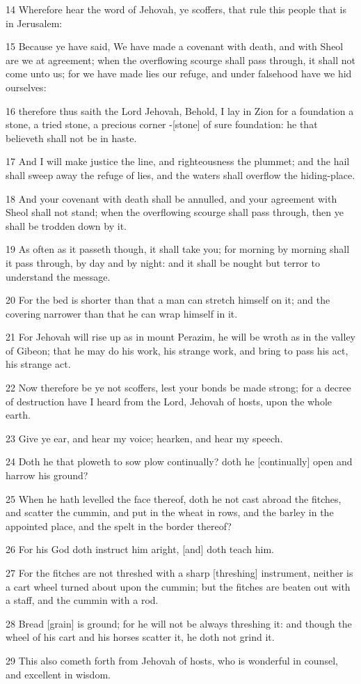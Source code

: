 \par 14 Wherefore hear the word of Jehovah, ye scoffers, that rule this people that is in Jerusalem:
\par 15 Because ye have said, We have made a covenant with death, and with Sheol are we at agreement; when the overflowing scourge shall pass through, it shall not come unto us; for we have made lies our refuge, and under falsehood have we hid ourselves:
\par 16 therefore thus saith the Lord Jehovah, Behold, I lay in Zion for a foundation a stone, a tried stone, a precious corner -[stone] of sure foundation: he that believeth shall not be in haste.
\par 17 And I will make justice the line, and righteousness the plummet; and the hail shall sweep away the refuge of lies, and the waters shall overflow the hiding-place.
\par 18 And your covenant with death shall be annulled, and your agreement with Sheol shall not stand; when the overflowing scourge shall pass through, then ye shall be trodden down by it.
\par 19 As often as it passeth though, it shall take you; for morning by morning shall it pass through, by day and by night: and it shall be nought but terror to understand the message.
\par 20 For the bed is shorter than that a man can stretch himself on it; and the covering narrower than that he can wrap himself in it.
\par 21 For Jehovah will rise up as in mount Perazim, he will be wroth as in the valley of Gibeon; that he may do his work, his strange work, and bring to pass his act, his strange act.
\par 22 Now therefore be ye not scoffers, lest your bonds be made strong; for a decree of destruction have I heard from the Lord, Jehovah of hosts, upon the whole earth.
\par 23 Give ye ear, and hear my voice; hearken, and hear my speech.
\par 24 Doth he that ploweth to sow plow continually? doth he [continually] open and harrow his ground?
\par 25 When he hath levelled the face thereof, doth he not cast abroad the fitches, and scatter the cummin, and put in the wheat in rows, and the barley in the appointed place, and the spelt in the border thereof?
\par 26 For his God doth instruct him aright, [and] doth teach him.
\par 27 For the fitches are not threshed with a sharp [threshing] instrument, neither is a cart wheel turned about upon the cummin; but the fitches are beaten out with a staff, and the cummin with a rod.
\par 28 Bread [grain] is ground; for he will not be always threshing it: and though the wheel of his cart and his horses scatter it, he doth not grind it.
\par 29 This also cometh forth from Jehovah of hosts, who is wonderful in counsel, and excellent in wisdom.

